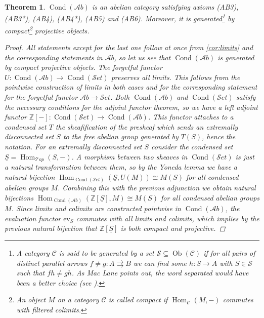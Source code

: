 \documentclass[11pt,A4]{article}
\theoremstyle{plain}
\newtheorem{thm}{Theorem}[section]
\theoremstyle{definition}
\theoremstyle{remark}
\newcommand{\Z}{\mathbb{Z}}
\newcommand{\1}{\mathbbm{1}}
\newcommand{\scrC}{\mathscr{C}}
\newcommand{\Top}{\mathscr{T}op}
\newcommand{\Ab}{\mathscr{A}b}
\newcommand{\Set}{\mathscr{S}et}
\DeclareMathOperator{\Hom}{Hom}
\DeclareMathOperator{\Cond}{Cond}
\DeclareMathOperator{\Ob}{Ob}
\renewcommand{\u}[1]{\underline{#1}}
\newcommand{\ev}{\mathrm{ev}}
\begin{document}
\begin{thm}\label{thm:abelian}
    $\Cond(\Ab)$ is an abelian category satisfying axioms (AB3), (AB3*), (AB4), (AB4*), (AB5) and (AB6).
    Moreover, it is generated\footnote{A category $\scrC$ is said to be \textit{generated} by a set $\mathscr{S}\subseteq \Ob(\scrC)$ if for all pairs of distinct parallel arrows $f\neq g\colon A\rightrightarrows B$ we can find some $h\colon S\to A$ with $S\in \mathscr{S}$ such that $fh\neq gh$.
    As Mac Lane points out, the word \textit{separated} would have been a better choice (see \cite[Section V.7]{mac78}).} by compact\footnote{An object $M$ on a category $\scrC$ is called \textit{compact} if $\Hom_{\scrC}(M,-)$ commutes with filtered colimits.} projective objects.
    \begin{proof}
	All statements except for the last one follow at once from \cref{cor:limits} and the corresponding statements in $\Ab$, so let us see that $\Cond(\Ab)$ is generated by compact projective objects.
	The forgetful functor $U\colon \Cond(\Ab)\to \Cond(\Set)$ preserves all limits.
	This follows from the pointwise construction of limits in both cases and for the corresponding statement for the forgetful functor $\Ab\to \Set$.
	Both $\Cond(\Ab)$ and $\Cond(\Set)$ satisfy the necessary conditions for the adjoint functor theorem, so we have a left adjoint functor $\Z[-]\colon\Cond(\Set)\to \Cond(\Ab)$.
	This functor attaches to a condensed set $T$ the sheafification of the presheaf which sends an extremally disconnected set $S$ to the free abelian group generated by $T(S)$, hence the notation.
	For an extremally disconnected set $S$ consider the condensed set $\u{S}=\Hom_{\Top}(S,-)$.
	A morphism between two sheaves in $\Cond(\Set)$ is just a natural transformation between them, so by the Yoneda lemma we have a natural bijection $\Hom_{\Cond(\Set)}(\u{S},U(M))\cong M(S)$ for all condensed abelian groups $M$.
	Combining this with the previous adjunction we obtain natural bijections $\Hom_{\Cond(\Ab)}(\Z[\u{S}],M)\cong M(S)$ for all condensed abelian groups $M$.
	Since limits and colimits are constructed pointwise in $\Cond(\Ab)$, the evaluation functor $\ev_{S}$ commutes with all limits and colimits, which implies by the previous natural bijection that $\Z[\u{S}]$ is both compact and projective.
	

\end{proof}
\end{thm}
\end{document}
